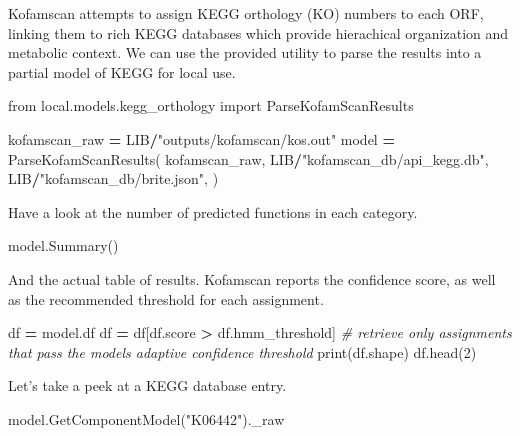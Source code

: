 \documentclass[
]{book}
\newenvironment{Shaded}{\begin{snugshade}}{\end{snugshade}}
\newcommand{\BuiltInTok}[1]{#1}
\newcommand{\CommentTok}[1]{\textcolor[rgb]{0.56,0.35,0.01}{\textit{#1}}}
\newcommand{\DecValTok}[1]{\textcolor[rgb]{0.00,0.00,0.81}{#1}}
\newcommand{\ImportTok}[1]{#1}
\newcommand{\NormalTok}[1]{#1}
\newcommand{\OperatorTok}[1]{\textcolor[rgb]{0.81,0.36,0.00}{\textbf{#1}}}
\newcommand{\StringTok}[1]{\textcolor[rgb]{0.31,0.60,0.02}{#1}}
\begin{document}
Kofamscan attempts to assign KEGG orthology (KO) numbers to each ORF, linking them to rich KEGG databases
which provide hierachical organization and metabolic context. We can use the provided utility to parse the
results into a partial model of KEGG for local use.

\begin{Shaded}
\begin{Highlighting}[numbers=left,,]
\ImportTok{from}\NormalTok{ local.models.kegg\_orthology }\ImportTok{import}\NormalTok{ ParseKofamScanResults}

\NormalTok{kofamscan\_raw }\OperatorTok{=}\NormalTok{ LIB}\OperatorTok{/}\StringTok{"outputs/kofamscan/kos.out"}
\NormalTok{model }\OperatorTok{=}\NormalTok{ ParseKofamScanResults(}
\NormalTok{    kofamscan\_raw,}
\NormalTok{    LIB}\OperatorTok{/}\StringTok{"kofamscan\_db/api\_kegg.db"}\NormalTok{,}
\NormalTok{    LIB}\OperatorTok{/}\StringTok{"kofamscan\_db/brite.json"}\NormalTok{,}
\NormalTok{)}
\end{Highlighting}
\end{Shaded}

Have a look at the number of predicted functions in each category.

\begin{Shaded}
\begin{Highlighting}[numbers=left,,]
\NormalTok{model.Summary()}
\end{Highlighting}
\end{Shaded}

And the actual table of results. Kofamscan reports the confidence score, as well as the recommended threshold for each assignment.

\begin{Shaded}
\begin{Highlighting}[numbers=left,,]
\NormalTok{df }\OperatorTok{=}\NormalTok{ model.df}
\NormalTok{df }\OperatorTok{=}\NormalTok{ df[df.score }\OperatorTok{\textgreater{}}\NormalTok{ df.hmm\_threshold] }\CommentTok{\# retrieve only assignments that pass the model\textquotesingle{}s adaptive confidence threshold}
\BuiltInTok{print}\NormalTok{(df.shape)}
\NormalTok{df.head(}\DecValTok{2}\NormalTok{)}
\end{Highlighting}
\end{Shaded}

Let's take a peek at a KEGG database entry.

\begin{Shaded}
\begin{Highlighting}[numbers=left,,]
\NormalTok{model.GetComponentModel(}\StringTok{"K06442"}\NormalTok{).\_raw}
\end{Highlighting}
\end{Shaded}
\end{document}

